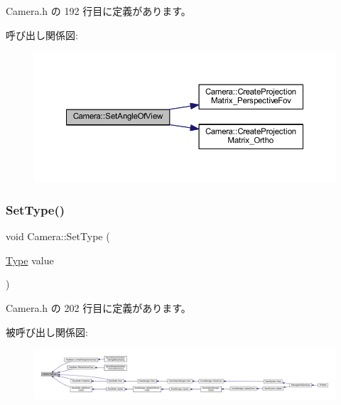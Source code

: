  Camera.\+h の 192 行目に定義があります。

呼び出し関係図\+:
\nopagebreak
\begin{figure}[H]
\begin{center}
\leavevmode
\includegraphics[width=350pt]{class_camera_a4c22c8ceed9126db627df9be7eb53a42_cgraph}
\end{center}
\end{figure}
\mbox{\label{class_camera_a6218126e761a8289c6e6bc8c66b05e47}} 
\subsubsection{\texorpdfstring{Set\+Type()}{SetType()}}
{\footnotesize\ttfamily void Camera\+::\+Set\+Type (\begin{DoxyParamCaption}\item[{\mbox{\hyperlink{class_camera_a3b0a1f58deca679ac665f61c480d1dcb}{Type}}}]{value }\end{DoxyParamCaption})\hspace{0.3cm}{\ttfamily [inline]}}



 Camera.\+h の 202 行目に定義があります。

被呼び出し関係図\+:
\nopagebreak
\begin{figure}[H]
\begin{center}
\leavevmode
\includegraphics[width=350pt]{class_camera_a6218126e761a8289c6e6bc8c66b05e47_icgraph}
\end{center}
\end{figure}
\mbox{\label{class_camera_a8b3337b3e560ea6a780d646bc8c509d7}} 
